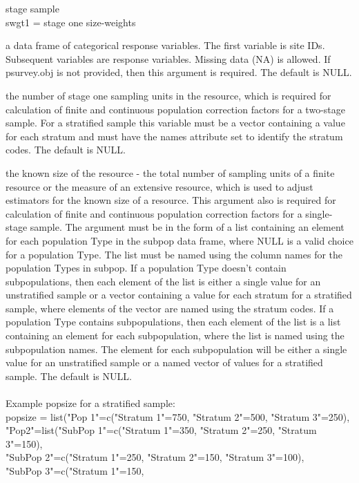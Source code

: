 \begin{Arguments}
\begin{ldescription}
stage sample\\
swgt1 = stage one size-weights
\item[\code{data.cat}] a data frame of categorical response variables.  The first 
variable is site IDs.  Subsequent variables are response variables.
Missing data (NA) is allowed.  If psurvey.obj is not provided, then
this argument is required.  The default is NULL.
\item[\code{N.cluster}] the number of stage one sampling units in the resource, which 
is required for calculation of finite and continuous population 
correction factors for a two-stage sample.  For a stratified sample 
this variable must be a vector containing a value for each stratum and
must have the names attribute set to identify the stratum codes.  The
default is NULL.
\item[\code{popsize}] the known size of the resource - the total number of sampling 
units of a finite resource or the measure of an extensive resource,
which is used to adjust estimators for the known size of a resource.
This argument also is required for calculation of finite and
continuous population correction factors for a single-stage sample.   
The argument must be in the form of a list containing an element for   
each population Type in the subpop data frame, where NULL is a valid   
choice for a population Type.  The list must be named using the column  
names for the population Types in subpop. If a population Type doesn't  
contain subpopulations, then each element of the list is either a  
single value for an unstratified sample or a vector containing a value  
for each stratum for a stratified sample, where elements of the vector
are named using the stratum codes.  If a population Type contains 
subpopulations, then each element of the list is a list containing an 
element for each subpopulation, where the list is named using the 
subpopulation names.  The element for each subpopulation will be 
either a single value for an unstratified sample or a named vector of 
values for a stratified sample.  The default is NULL.\\\\
Example popsize for a stratified sample:\\
popsize = list("Pop 1"=c("Stratum 1"=750, "Stratum 2"=500,
"Stratum 3"=250),\\ "Pop2"=list("SubPop 1"=c("Stratum 1"=350,
"Stratum 2"=250, "Stratum 3"=150),\\ "SubPop 2"=c("Stratum 1"=250,
"Stratum 2"=150, "Stratum 3"=100),\\ "SubPop 3"=c("Stratum 1"=150,

\end{ldescription}
\end{Arguments}
